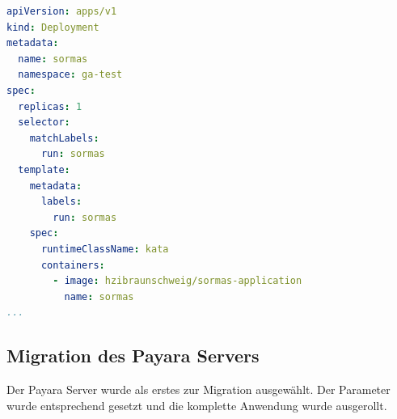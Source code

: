 \begin{lstlisting}[language=yaml, caption=runtimeClassName, label=lst:runtimeClassName]
apiVersion: apps/v1
kind: Deployment
metadata:
  name: sormas
  namespace: ga-test
spec: 
  replicas: 1
  selector: 
    matchLabels:
      run: sormas
  template:
    metadata:
      labels:
        run: sormas
    spec:
      runtimeClassName: kata
      containers:
        - image: hzibraunschweig/sormas-application
          name: sormas
...
\end{lstlisting}


\subsection{Migration des Payara Servers}
\label{ref:payara_kata}
Der Payara Server wurde als erstes zur Migration ausgewählt. 
Der Parameter wurde entsprechend gesetzt und die komplette Anwendung wurde ausgerollt. 

